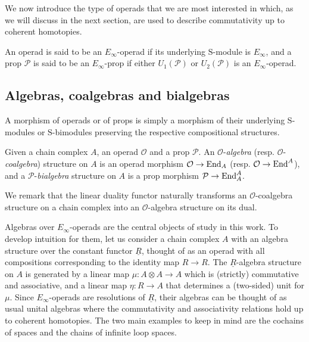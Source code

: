 We now introduce the type of operads that we are most interested in which, as we will discuss in the next section, are used to describe commutativity up to coherent homotopies.

\begin{definition}  \label{def: e-infinity operad and prop}
	An operad is said to be an $E_\infty$-operad if its underlying $\mathrm{S}$-module is $E_\infty$, and a prop $\mathcal P$ is said to be an $E_\infty$-prop if either $U_1(\mathcal P)$ or $U_2(\mathcal P)$ is an $E_\infty$-operad.
\end{definition}

\subsection{Algebras, coalgebras and bialgebras}

A morphism of operads or of props is simply a morphism of their underlying $\mathrm{S}$-modules or $\mathrm{S}$-bimodules preserving the respective compositional structures.

Given a chain complex $A$, an operad $\mathcal O$ and a prop $\mathcal P$.
An $\mathcal O$-\textit{algebra} (resp. $\mathcal O$-\textit{coalgebra}) structure on $A$ is an operad morphism $\mathcal O \to \mathrm{End}_A$ (resp. $\mathcal O \to \mathrm{End}^A$), and a $\mathcal P$-\textit{bialgebra} structure on $A$ is a prop morphism $\mathcal P \to \mathrm{End}_A^A$.

We remark that the linear duality functor naturally transforms an $\mathcal O$-coalgebra structure on a chain complex into an $\mathcal O$-algebra structure on its dual.

Algebras over $E_\infty$-operads are the central objects of study in this work.
To develop intuition for them, let us consider a chain complex $A$ with an algebra structure over the constant functor $\underline{R}$, thought of as an operad with all compositions corresponding to the identity map $R \to R$.
The $\underline{R}$-algebra structure on $A$ is generated by a linear map $\mu \colon A \otimes A \to A$ which is (strictly) commutative and associative, and a linear map $\eta \colon R \to A$ that determines a (two-sided) unit for $\mu$.
Since $E_\infty$-operads are resolutions of $\underline{R}$, their algebras can be thought of as usual unital algebras where the commutativity and associativity relations hold up to coherent homotopies.
The two main examples to keep in mind are the cochains of spaces and the chains of infinite loop spaces.
